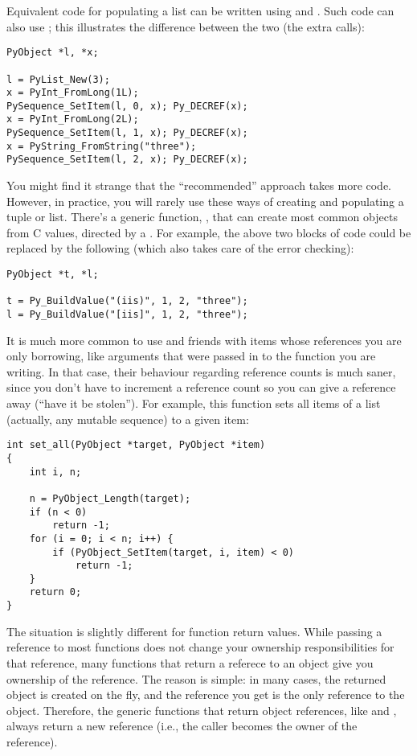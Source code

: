 \documentclass{manual}
\begin{document}
Equivalent code for populating a list can be written using 
 and .  Such code
can also use ; this illustrates the
difference between the two (the extra  calls):

\begin{verbatim}
PyObject *l, *x;

l = PyList_New(3);
x = PyInt_FromLong(1L);
PySequence_SetItem(l, 0, x); Py_DECREF(x);
x = PyInt_FromLong(2L);
PySequence_SetItem(l, 1, x); Py_DECREF(x);
x = PyString_FromString("three");
PySequence_SetItem(l, 2, x); Py_DECREF(x);
\end{verbatim}

You might find it strange that the ``recommended'' approach takes more
code.  However, in practice, you will rarely use these ways of
creating and populating a tuple or list.  There's a generic function,
, that can create most common objects from
C values, directed by a .  For example, the
above two blocks of code could be replaced by the following (which
also takes care of the error checking):

\begin{verbatim}
PyObject *t, *l;

t = Py_BuildValue("(iis)", 1, 2, "three");
l = Py_BuildValue("[iis]", 1, 2, "three");
\end{verbatim}

It is much more common to use  and
friends with items whose references you are only borrowing, like
arguments that were passed in to the function you are writing.  In
that case, their behaviour regarding reference counts is much saner,
since you don't have to increment a reference count so you can give a
reference away (``have it be stolen'').  For example, this function
sets all items of a list (actually, any mutable sequence) to a given
item:

\begin{verbatim}
int set_all(PyObject *target, PyObject *item)
{
    int i, n;

    n = PyObject_Length(target);
    if (n < 0)
        return -1;
    for (i = 0; i < n; i++) {
        if (PyObject_SetItem(target, i, item) < 0)
            return -1;
    }
    return 0;
}
\end{verbatim}

The situation is slightly different for function return values.  
While passing a reference to most functions does not change your 
ownership responsibilities for that reference, many functions that 
return a referece to an object give you ownership of the reference.
The reason is simple: in many cases, the returned object is created 
on the fly, and the reference you get is the only reference to the 
object.  Therefore, the generic functions that return object 
references, like  and 
, always return a new reference (i.e.,
the  caller becomes the owner of the reference).
\end{document}
